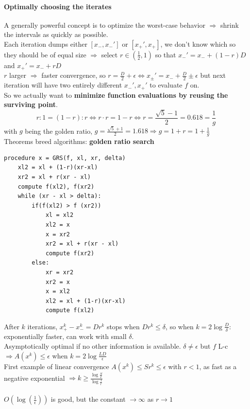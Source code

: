 \documentclass[10pt]{report}
\begin{document}
\paragraph{Optimally choosing the iterates} A generally powerful concept is to optimize the worst-case behavior $\Rightarrow$ shrink the intervals as quickly as possible.\\
Each iteration dumps either $[x_-, x_-']$ or $[x_+', x_+]$, we don't know which so they should be of equal size $\Rightarrow$ select $r\in (\frac{1}{2},1)$ so that $x_-' = x_- + (1-r)D$ and $x_+' = x_- + rD$\\
$r$ larger $\Rightarrow$ faster convergence, so $r = \frac{D}{2} + \epsilon \Leftrightarrow x_\pm' = x_- + \frac{D}{2}\pm\epsilon$ but next iteration will have two entirely different $x_-', x_+'$ to evaluate $f$ on.\\
So we actually want to \textbf{minimize function evaluations by reusing the surviving point}. $$r : 1 = (1 - r) : r \Leftrightarrow r\cdot r = 1 - r \Leftrightarrow r = \frac{\sqrt{5} - 1}{2} = 0.618 = \frac{1}{g}$$ with $g$ being the golden ratio, $g = \frac{\sqrt{5} + 1}{2} = 1.618 \Rightarrow g = 1 + r = 1 + \frac{1}{g}$\\
Theorems breed algorithms: \textbf{golden ratio search}\\
\begin{lstlisting}[style=myPython]
procedure x = GRS(f, xl, xr, delta)
	xl2 = xl + (1-r)(xr-xl)
	xr2 = xl + r(xr - xl)
	compute f(xl2), f(xr2)
	while (xr - xl > delta):
		if(f(xl2) > f (xr2))
			xl = xl2
			xl2 = x
			x = xr2
			xr2 = xl + r(xr - xl)
			compute f(xr2)
		else:
			xr = xr2
			xr2 = x
			x = xl2
			xl2 = xl + (1-r)(xr-xl)
			compute f(xl2)
\end{lstlisting}
After $k$ iterations, $x_+^k - x_-^k = Dr^k$ stops when $Dr^k \leq \delta$, so when $k = 2\log\frac{D}{\delta}$: exponentially faster, can work with small $\delta$.\\
Asymptotically optimal if no other information is available. $\delta \neq \epsilon$ but $f$ L-c $\Rightarrow A(x^k) \leq \epsilon$ when $k = 2\log\frac{LD}{\epsilon}$\\
First example of linear convergence $A(x^k) \leq Sr^k \leq \epsilon$ with $r < 1$, as fast as a negative exponential $\Rightarrow k \geq \frac{\displaystyle \log\frac{S}{\epsilon}}{\displaystyle \log\frac{1}{r}}$\\\\
$O(\log(\frac{1}{\epsilon}))$ is good, but the constant $\rightarrow\infty$ as $r\rightarrow 1$
\end{document}
